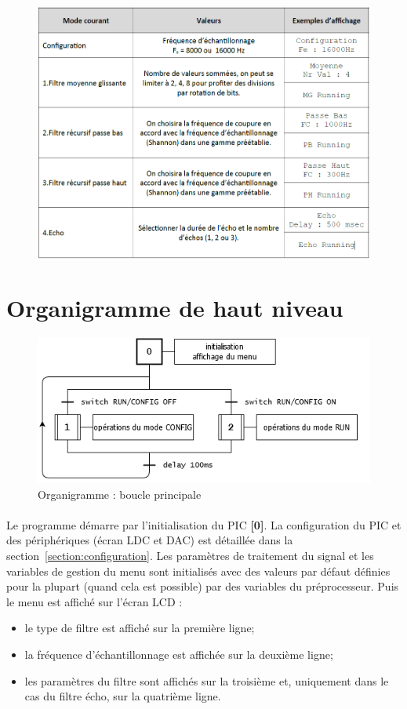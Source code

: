 \documentclass{article}
\begin{document}
    \begin{figure}[H]
        \centering
        \includegraphics[width=.7\textwidth]{./images/menus.png}
    \end{figure}

    \newpage
    \section{Organigramme de haut niveau}
    \begin{figure}[H]
        \centering
        \includegraphics[width=.5\textwidth]{./images/orga_global.png}
        \caption{Organigramme : boucle principale}
    \end{figure}

    \paragraph{}
    Le programme démarre par l'initialisation du PIC \textbf{[0]}. La configuration du PIC et des périphériques (écran LDC et DAC) est détaillée dans la section~\ref{section:configuration}. Les paramètres de traitement du signal et les variables de gestion du menu sont initialisés avec des valeurs par défaut définies pour la plupart (quand cela est possible) par des variables du préprocesseur. Puis le menu est affiché sur l'écran LCD :
    \begin{itemize}
        \item le type de filtre est affiché sur la première ligne;
        \item la fréquence d'échantillonnage est affichée sur la deuxième ligne;
        \item les paramètres du filtre sont affichés sur la troisième et, uniquement dans le cas du filtre écho, sur la quatrième ligne.
    \end{itemize}
\end{document}
